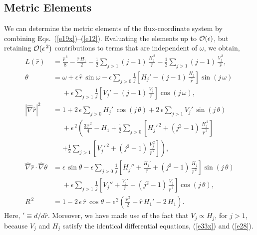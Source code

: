 \documentclass[12pt,prb,aps]{revtex4-1}
\begin{document}
\subsection{Metric Elements}\label{metric}
We can determine the metric elements of the flux-coordinate system by combining Eqs.~(\ref{e19x})--(\ref{e12}).
Evaluating the elements up to ${\cal O}(\epsilon)$, but retaining ${\cal O}(\epsilon^{\,2})$ contributions to terms that are independent of
$\omega$, we obtain,\cite{am1,gim,fitz2024}
\begin{align}\label{epdef}
L(\hat{r})&= \frac{\hat{r}^{\,3}}{8} -\frac{\hat{r}\,H_1}{2}-\frac{1}{2}\sum_{j>1}(j-1)\,\frac{H_j^{\,2}}{\hat{r}}
-\frac{1}{2}\sum_{j>1}(j-1)\,\frac{V_j^{\,2}}{\hat{r}},\\[0.5ex]
\theta &= \omega+\epsilon\,\hat{r}\,\sin\omega - \epsilon\sum_{j>0}\frac{1}{j}\left[H_j'-(j-1)\,\frac{H_j}{\hat{r}}\right]\sin(j\,\omega)
\nonumber\\[0.5ex]&\phantom{=}+ \epsilon\sum_{j>1}\frac{1}{j}\left[V_j'-(j-1)\,\frac{V_j}{\hat{r}}\right]\cos(j\,\omega),\label{e22y}\\[0.5ex]
|\hat{\nabla} \hat{r}|^2 &= 1 +2\,\epsilon\sum_{j>0}H_j'\,\cos(j\,\theta) +2\,\epsilon\sum_{j>1}V_j'\,\sin(j\,\theta) \nonumber\\[0.5ex]
&\phantom{=}+\epsilon^{\,2}\left(\frac{3\,\hat{r}^{\,2}}{4}-H_1+
\frac{1}{2}\sum_{j>0}\left[H_j'^{\,2}+(j^2-1)\,\frac{H_j^{\,2}}{\hat{r}^{\,2}}\right]\right.\nonumber\\[0.5ex]&\phantom{=}\left.+
\frac{1}{2}\sum_{j>1}\left[V_j'^{\,2}+(j^2-1)\,\frac{V_j^{\,2}}{\hat{r}^{\,2}}\right]
\right),\label{e19}\\[0.5ex]
\hat{\nabla}\hat{r}\cdot\hat{\nabla}\theta&=\epsilon\,\sin\theta
-\epsilon\sum_{j>0}\frac{1}{j}\left[H_j''+\frac{H_j'}{\hat{r}}+(j^2-1)\,\frac{H_j}{\hat{r}^{\,2}}\right]\sin(j\,\theta)\nonumber\\[0.5ex]&
\phantom{=}+\epsilon\sum_{j>1}\frac{1}{j}\left[V_j''+\frac{V_j'}{\hat{r}}+(j^2-1)\,\frac{V_j}{\hat{r}^{\,2}}\right]\cos(j\,\theta),
\\[0.5ex]
R^{\,2}&= 1-2\,\epsilon\,\hat{r}\,\cos\theta -\epsilon^{\,2}\left(\frac{\hat{r}^{\,2}}{2}-\hat{r}\,H_1'-2\,H_1\right).\label{e25a}
\end{align}
Here, $'\equiv d/d\hat{r}$. Moreover, we have made use of the fact that $V_j\propto H_j$, for $j>1$, because
$V_j$ and $H_j$ satisfy the identical differential equations, (\ref{e33x}) and (\ref{e28}). 
\end{document}
